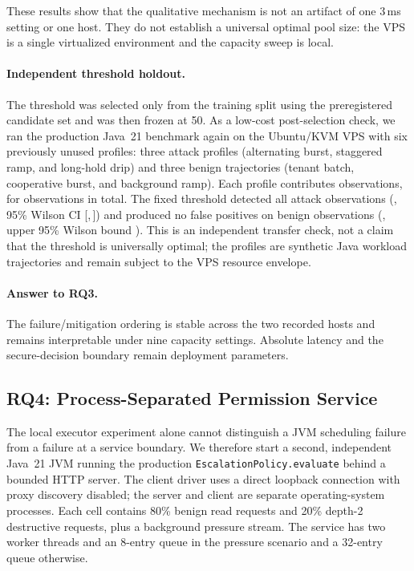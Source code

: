 These results show that the qualitative mechanism is not an artifact of one
3\,ms setting or one host. They do not establish a universal optimal pool
size: the VPS is a single virtualized environment and the capacity sweep is
local.

\paragraph{Independent threshold holdout.}
The threshold was selected only from the training split using the preregistered
candidate set and was then frozen at 50. As a low-cost post-selection check, we
ran the production Java~21 benchmark again on the Ubuntu/KVM VPS with six
previously unused profiles: three attack profiles (alternating burst,
staggered ramp, and long-hold drip) and three benign trajectories (tenant
batch, cooperative burst, and background ramp). Each profile contributes
\ThresholdHoldoutPerProfileCount{} observations, for
\ThresholdHoldoutObservationCount{} observations in total. The fixed threshold
detected all \ThresholdHoldoutAttackCount{} attack observations
(\ThresholdHoldoutAttackDetection{}, 95\% Wilson CI
[\ThresholdHoldoutAttackCILow{},\,\ThresholdHoldoutAttackCIHigh{}]) and produced
no false positives on \ThresholdHoldoutBenignCount{} benign observations
(\ThresholdHoldoutBenignFP{}, upper 95\% Wilson bound
\ThresholdHoldoutBenignFPCIHigh{}). This is an independent transfer check, not
a claim that the threshold is universally optimal; the profiles are synthetic
Java workload trajectories and remain subject to the VPS resource envelope.

\paragraph{Answer to RQ3.}
The failure/mitigation ordering is stable across the two recorded hosts and
remains interpretable under nine capacity settings. Absolute latency and the
secure-decision boundary remain deployment parameters.

\subsection{RQ4: Process-Separated Permission Service}
\label{sec:eval-remote-permission}

The local executor experiment alone cannot distinguish a JVM scheduling
failure from a failure at a service boundary. We therefore start a second,
independent Java~21 JVM running the production
\texttt{EscalationPolicy.evaluate} behind a bounded HTTP server. The client
driver uses a direct loopback connection with proxy discovery disabled; the
server and client are separate operating-system processes. Each cell contains
80\% benign read requests and 20\% depth-2 destructive requests, plus a
background pressure stream. The service has two worker threads and an
8-entry queue in the pressure scenario and a 32-entry queue otherwise.

